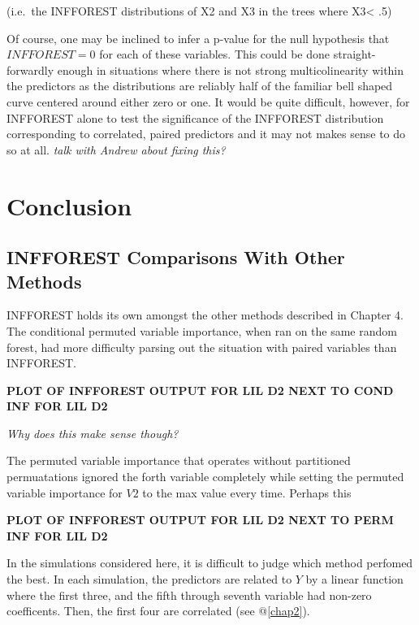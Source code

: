 \documentclass[12pt,twoside]{reedthesis}
\begin{document}
  (i.e.~the INFFOREST distributions of X2 and X3 in the trees where
  X3\textless{} .5)
  
  Of course, one may be inclined to infer a p-value for the null
  hypothesis that \(INFFOREST = 0\) for each of these variables. This
  could be done straight-forwardly enough in situations where there is not
  strong multicolinearity within the predictors as the distributions are
  reliably half of the familiar bell shaped curve centered around either
  zero or one. It would be quite difficult, however, for INFFOREST alone
  to test the significance of the INFFOREST distribution corresponding to
  correlated, paired predictors and it may not makes sense to do so at
  all. \emph{talk with Andrew about fixing this?}
  
  \chapter*{Conclusion}\label{conclusion}
  
  \setcounter{chapter}{4} \setcounter{section}{0}
  
  \section{INFFOREST Comparisons With Other
  Methods}\label{infforest-comparisons-with-other-methods}
  
  INFFOREST holds its own amongst the other methods described in Chapter
  4. The conditional permuted variable importance, when ran on the same
  random forest, had more difficulty parsing out the situation with paired
  variables than INFFOREST.
  
  \textbf{PLOT OF INFFOREST OUTPUT FOR LIL D2 NEXT TO COND INF FOR LIL D2}
  
  \emph{Why does this make sense though?}
  
  The permuted variable importance that operates without partitioned
  permuatations ignored the forth variable completely while setting the
  permuted variable importance for \(V2\) to the max value every time.
  Perhaps this
  
  \textbf{PLOT OF INFFOREST OUTPUT FOR LIL D2 NEXT TO PERM INF FOR LIL D2}
  
  In the simulations considered here, it is difficult to judge which
  method perfomed the best. In each simulation, the predictors are related
  to \(Y\) by a linear function where the first three, and the fifth
  through seventh variable had non-zero coefficents. Then, the first four
  are correlated (see @\ref{chap2}).
  
\end{document}
